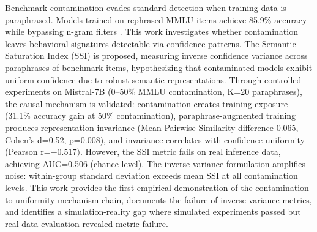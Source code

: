 
Benchmark contamination evades standard detection when training data is paraphrased. Models trained on rephrased MMLU items achieve 85.9\% accuracy while bypassing n-gram filters \citep{yang2023rethinking}. This work investigates whether contamination leaves behavioral signatures detectable via confidence patterns. The Semantic Saturation Index (SSI) is proposed, measuring inverse confidence variance across paraphrases of benchmark items, hypothesizing that contaminated models exhibit uniform confidence due to robust semantic representations. Through controlled experiments on Mistral-7B (0--50\% MMLU contamination, K=20 paraphrases), the causal mechanism is validated: contamination creates training exposure (31.1\% accuracy gain at 50\% contamination), paraphrase-augmented training produces representation invariance (Mean Pairwise Similarity difference 0.065, Cohen's d=0.52, p=0.008), and invariance correlates with confidence uniformity (Pearson r=$-0.517)$. However, the SSI metric fails on real inference data, achieving AUC=0.506 (chance level). The inverse-variance formulation amplifies noise: within-group standard deviation exceeds mean SSI at all contamination levels. This work provides the first empirical demonstration of the contamination-to-uniformity mechanism chain, documents the failure of inverse-variance metrics, and identifies a simulation-reality gap where simulated experiments passed but real-data evaluation revealed metric failure.
